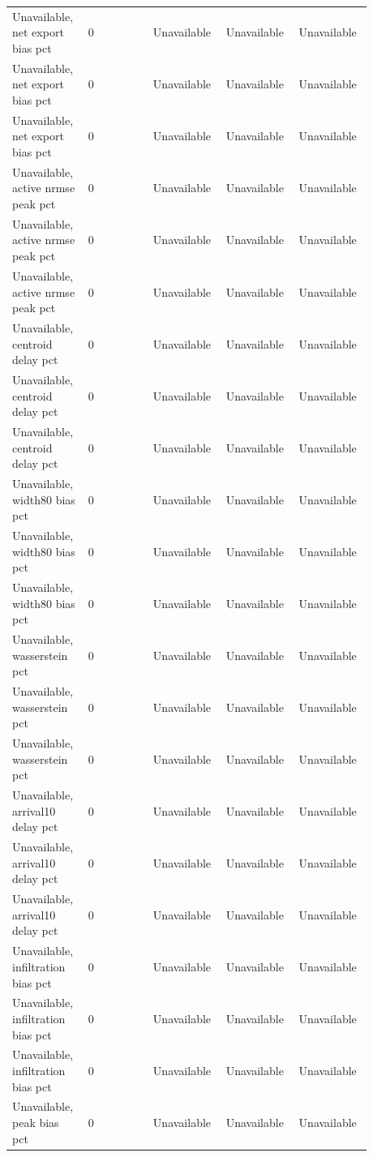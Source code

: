 \begin{longtable}{p{0.1760\linewidth}p{0.1760\linewidth}p{0.1760\linewidth}p{0.1760\linewidth}p{0.1760\linewidth}}
Unavailable, net export bias pct & 0 & Unavailable & Unavailable & Unavailable \\
Unavailable, net export bias pct & 0 & Unavailable & Unavailable & Unavailable \\
Unavailable, net export bias pct & 0 & Unavailable & Unavailable & Unavailable \\
Unavailable, active nrmse peak pct & 0 & Unavailable & Unavailable & Unavailable \\
Unavailable, active nrmse peak pct & 0 & Unavailable & Unavailable & Unavailable \\
Unavailable, active nrmse peak pct & 0 & Unavailable & Unavailable & Unavailable \\
Unavailable, centroid delay pct & 0 & Unavailable & Unavailable & Unavailable \\
Unavailable, centroid delay pct & 0 & Unavailable & Unavailable & Unavailable \\
Unavailable, centroid delay pct & 0 & Unavailable & Unavailable & Unavailable \\
Unavailable, width80 bias pct & 0 & Unavailable & Unavailable & Unavailable \\
Unavailable, width80 bias pct & 0 & Unavailable & Unavailable & Unavailable \\
Unavailable, width80 bias pct & 0 & Unavailable & Unavailable & Unavailable \\
Unavailable, wasserstein pct & 0 & Unavailable & Unavailable & Unavailable \\
Unavailable, wasserstein pct & 0 & Unavailable & Unavailable & Unavailable \\
Unavailable, wasserstein pct & 0 & Unavailable & Unavailable & Unavailable \\
Unavailable, arrival10 delay pct & 0 & Unavailable & Unavailable & Unavailable \\
Unavailable, arrival10 delay pct & 0 & Unavailable & Unavailable & Unavailable \\
Unavailable, arrival10 delay pct & 0 & Unavailable & Unavailable & Unavailable \\
Unavailable, infiltration bias pct & 0 & Unavailable & Unavailable & Unavailable \\
Unavailable, infiltration bias pct & 0 & Unavailable & Unavailable & Unavailable \\
Unavailable, infiltration bias pct & 0 & Unavailable & Unavailable & Unavailable \\
Unavailable, peak bias pct & 0 & Unavailable & Unavailable & Unavailable \\

\end{longtable}
